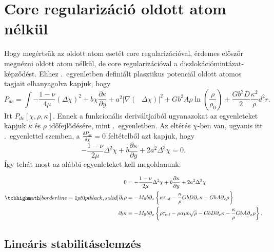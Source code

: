 \documentclass[10pt,a4paper]{scrartcl}
\begin{document}
\section{Core regularizáció oldott atom nélkül}
Hogy megértsük az oldott atom esetét core regularizációval, érdemes először megnézni oldott atom nélkül, de core regularizációval a diszlokációmintázat-képződést. Ehhez .\ egyenletben definiált plasztikus potenciál oldott atomos tagjait elhanyagolva kapjuk, hogy 
\begin{equation} \label{eq:plastic_pot_dc}
{P_{dc}} = \int { - \frac{{1 - \nu }}{{4\mu }}{{\left( {\Delta \chi } \right)}^2} + b\chi \frac{{\partial \kappa }}{{\partial y}} + {a^2}{{\left| {\nabla \left( {{\text{ }}\Delta \chi } \right)} \right|}^2} + G{b^2}A\rho \ln \left( {\frac{\rho }{{{\rho _0}}}} \right) + \frac{{G{b^2}D}}{2}\frac{{{\kappa ^2}}}{\rho }{d^2}r}.
\end{equation}
Itt ${P_{dc}}\left[ {\chi ,\rho ,\kappa } \right]$. Ennek a funkcionális deriváltjaiból ugyanazokat az egyenleteket kapjuk $\kappa$ és $\rho$ időfejlődésére, mint .\ egyenletben. Az eltérés $\chi$-ben van, ugyanis itt .\ egyenlettel szemben, a $\frac{{\delta {P_{dc}}}}{{\delta \chi }} = 0$ feltételből azt kapjuk, hogy 
\[ - \frac{{1 - \nu }}{{2\mu }}{\Delta ^2}\chi  + b\frac{{\partial \kappa }}{{\partial y}} + 2{a^2}{\Delta ^3}\chi  = 0.\]
Így tehát most az alábbi egyenleteket kell megoldanunk:

\begin{gather} \label{eq:eom_dc}
\tcbhighmath[borderline={1pt}{0pt}{black,solid}]{
\begin{aligned}
0 & = - \frac{{1 - \nu }}{{2\mu }}{\Delta ^2}\chi  + b\frac{{\partial \kappa }}{{\partial y}} + 2{a^2}{\Delta ^3}\chi  \\ 
    {\partial _t}\rho  &  =  - {M_0}b{\partial _x}\left\{ {\kappa {\tau _{{\text{mf}}}} - \frac{\kappa }{\rho }GbD{\partial _x}\kappa  - GbA{\partial _x}\rho } \right\} \\ 
  {\partial _t}\kappa  &  =  - {M_0}b{\partial _x}\left\{ {\rho {\tau _{{\text{mf}}}} - \rho \alpha \mu b\sqrt \rho - GbD{\partial _x}\kappa  - \frac{\kappa }{\rho } GbA{\partial _x}\rho } \right\}.\\
\end{aligned}  }
\end{gather}
\subsection{Lineáris stabilitáselemzés}
\end{document}
